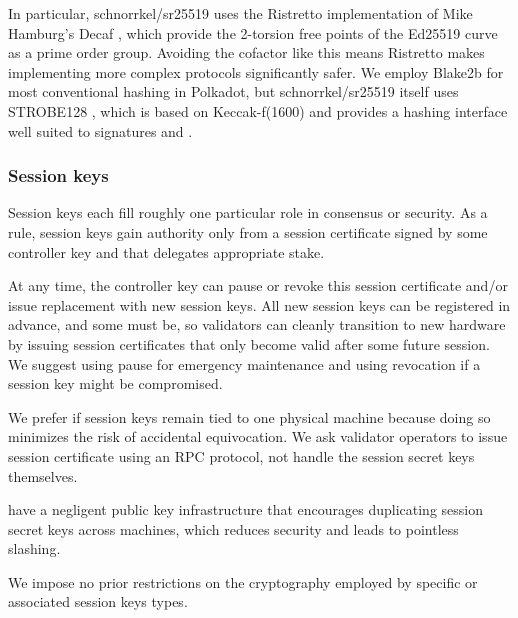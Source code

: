 In particular, schnorrkel/sr25519 uses the Ristretto implementation \cite{Ristretto} of Mike Hamburg's Decaf , which provide the 2-torsion free points of the Ed25519 curve as a prime order group.  Avoiding the cofactor like this means Ristretto makes implementing more complex protocols significantly safer.  We employ Blake2b for most conventional hashing in Polkadot, but schnorrkel/sr25519 itself uses STROBE128 \cite{STROBE}, which is based on Keccak-f(1600) and provides a hashing interface well suited to signatures and .

\subsubsection{Session keys}\label{sec:session_keys}

Session keys each fill roughly one particular role in consensus or security.  As a rule, session keys gain authority only from a session certificate signed by some controller key and that delegates appropriate stake.  

At any time, the controller key can pause or revoke this session certificate and/or issue replacement with new session keys.  All new session keys can be registered in advance, and some must be, so validators can cleanly transition to new hardware by issuing session certificates that only become valid after some future session.  We suggest using pause for emergency maintenance and using revocation if a session key might be compromised.  

We prefer if session keys remain tied to one physical machine because doing so minimizes the risk of accidental equivocation.  We ask validator operators to issue session certificate using an RPC protocol, not  handle the session secret keys themselves.  

 have a negligent public key infrastructure that encourages duplicating session secret keys across machines, which reduces security and leads to pointless slashing.

\smallskip

We impose no prior restrictions on the cryptography employed by specific  or associated session keys types.  

